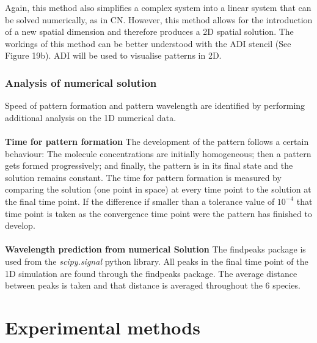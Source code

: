 Again, this method also simplifies a complex system into a linear system that can be solved numerically, as in \acrshort{CN}. However, this method allows for the introduction of a new spatial dimension and therefore produces a 2D spatial solution. The workings of this method can be better understood with the \acrshort{ADI} stencil (See Figure 19b). \acrshort{ADI} will be used to visualise patterns in 2D.
\subsubsection{Analysis of numerical solution}
Speed of pattern formation and pattern wavelength are identified by performing additional analysis on the 1D numerical data.  \\\\
\textbf{Time for pattern formation}
The development of the pattern follows a certain behaviour: The molecule concentrations are initially homogeneous; then a pattern gets formed progressively; and finally, the pattern is in its final state and the solution remains constant.  The time for pattern formation is measured by comparing the solution (one point in space) at every time point to the solution at the final time point. If the difference if smaller than a tolerance value of $10^{-4}$ that time point is taken as the convergence time point were the pattern has finished to  develop. \\\\
\textbf{Wavelength prediction from numerical Solution}
The findpeaks package is used from the \textit{scipy.signal} python library. All peaks in the final time point of the 1D simulation are found through the findpeaks package. The average distance between peaks is taken and that distance is averaged throughout the 6 species.

%
\section{Experimental methods}
